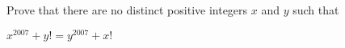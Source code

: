 Prove that there are no distinct positive integers $x$ and $y$ such that

$x^{2007} + y! = y^{2007} + x! $